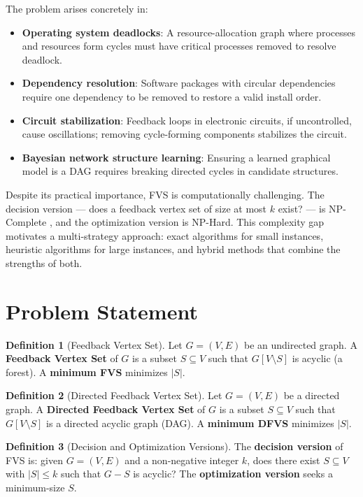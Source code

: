 \documentclass[10pt,a4paper]{report}
\theoremstyle{definition}
\newtheorem{definition}{Definition}[chapter]
\newcommand{\fvs}{\textsc{FVS}}
\begin{document}
The problem arises concretely in:
\begin{itemize}
	\item \textbf{Operating system deadlocks}: A resource-allocation graph where processes and resources form cycles must have critical processes removed to resolve deadlock.
	\item \textbf{Dependency resolution}: Software packages with circular dependencies require one dependency to be removed to restore a valid install order.
	\item \textbf{Circuit stabilization}: Feedback loops in electronic circuits, if uncontrolled, cause oscillations; removing cycle-forming components stabilizes the circuit.
	\item \textbf{Bayesian network structure learning}: Ensuring a learned graphical model is a DAG requires breaking directed cycles in candidate structures.
\end{itemize}

Despite its practical importance, \fvs{} is computationally challenging. The decision version --- does a feedback vertex set of size at most $k$ exist? --- is NP-Complete \cite{karp1972}, and the optimization version is NP-Hard. This complexity gap motivates a multi-strategy approach: exact algorithms for small instances, heuristic algorithms for large instances, and hybrid methods that combine the strengths of both.

\section{Problem Statement}

\begin{definition}[Feedback Vertex Set]
	Let $G = (V, E)$ be an undirected graph. A \textbf{Feedback Vertex Set} of $G$ is a subset $S \subseteq V$ such that $G[V \setminus S]$ is acyclic (a forest). A \textbf{minimum FVS} minimizes $|S|$.
\end{definition}

\begin{definition}[Directed Feedback Vertex Set]
	Let $G = (V, E)$ be a directed graph. A \textbf{Directed Feedback Vertex Set} of $G$ is a subset $S \subseteq V$ such that $G[V \setminus S]$ is a directed acyclic graph (DAG). A \textbf{minimum DFVS} minimizes $|S|$.
\end{definition}

\begin{definition}[Decision and Optimization Versions]
	The \textbf{decision version} of \fvs{} is: given $G = (V, E)$ and a non-negative integer $k$, does there exist $S \subseteq V$ with $|S| \leq k$ such that $G - S$ is acyclic? The \textbf{optimization version} seeks a minimum-size $S$.
\end{definition}
\end{document}
